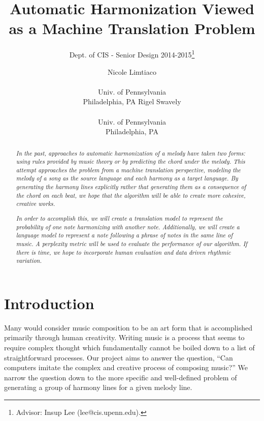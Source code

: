 \documentclass{sig-alternate}
\begin{document}
 

\title{Automatic Harmonization Viewed as a Machine Translation Problem}
\subtitle{Dept. of CIS - Senior Design 2014-2015\thanks{Advisor: Insup Lee (lee@cis.upenn.edu).}}
\author{
\alignauthor Nicole Limtiaco \\  \\ Univ. of Pennsylvania \\ Philadelphia, PA
\alignauthor Rigel Swavely \\  \\ Univ. of Pennsylvania \\ Philadelphia, PA}
\date{}
\maketitle

\begin{abstract}
  \textit{In the past, approaches to automatic harmonization of a melody
  have taken two forms: using rules provided by music theory or by predicting
  the chord under the melody. This attempt approaches the problem from a machine translation perspective, 
  modeling the melody of a song as the source language and each harmony as a target language.
  By generating the harmony lines explicitly rather that generating them as a
  consequence of the chord on each beat, we hope that the algorithm will be able to create
  more cohesive, creative works.}

  \textit{In order to accomplish this, we will create a translation model to represent the probability
  of one note harmonizing with another note. Additionally, we will create a language model to represent
  a note following a phrase of notes in the same line of music. A perplexity metric will be used to 
  evaluate the performance of our algorithm. If there is time, we hope to incorporate human evaluation
  and data driven rhythmic variation.}
\end{abstract}

\section{Introduction}
\label{sec:intro}
Many would consider music composition to be an art form that is accomplished
primarily through human creativity. Writing music is a process that seems to require
complex thought which fundamentally cannot be boiled down to a list of straightforward
processes. Our project aims to answer the question, ``Can computers imitate the complex
and creative process of composing music?'' We narrow the question down to the more specific
and well-defined problem of generating a group of harmony lines for a given melody line.
\end{document}
